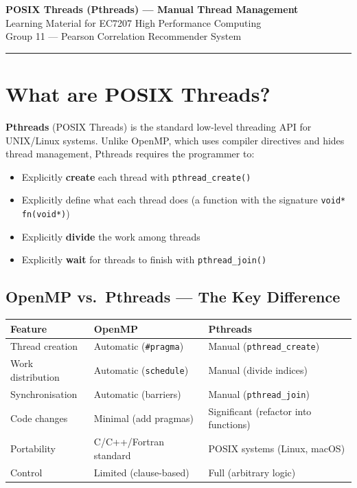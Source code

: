 \documentclass[12pt,a4paper]{article}
\begin{document}

\begin{center}
    {\LARGE\bfseries POSIX Threads (Pthreads) — Manual Thread Management}\\[0.5em]
    {\large Learning Material for EC7207 High Performance Computing}\\[0.3em]
    {\normalsize Group 11 — Pearson Correlation Recommender System}
\end{center}
\vspace{1em}\hrule\vspace{1.5em}

\section{What are POSIX Threads?}

\textbf{Pthreads} (POSIX Threads) is the standard low-level threading API
for UNIX/Linux systems.  Unlike OpenMP, which uses compiler directives and
hides thread management, Pthreads requires the programmer to:

\begin{itemize}
    \item Explicitly \textbf{create} each thread with \texttt{pthread\_create()}
    \item Explicitly define what each thread does (a function with the signature
          \texttt{void* fn(void*)})
    \item Explicitly \textbf{divide} the work among threads
    \item Explicitly \textbf{wait} for threads to finish with
          \texttt{pthread\_join()}
\end{itemize}

\subsection{OpenMP vs.\ Pthreads — The Key Difference}

\begin{center}
\begin{tabular}{lll}
\toprule
Feature & OpenMP & Pthreads \\
\midrule
Thread creation & Automatic (\texttt{\#pragma}) & Manual (\texttt{pthread\_create}) \\
Work distribution & Automatic (\texttt{schedule}) & Manual (divide indices) \\
Synchronisation & Automatic (barriers) & Manual (\texttt{pthread\_join}) \\
Code changes & Minimal (add pragmas) & Significant (refactor into functions) \\
Portability & C/C++/Fortran standard & POSIX systems (Linux, macOS) \\
Control & Limited (clause-based) & Full (arbitrary logic) \\
\bottomrule
\end{tabular}
\end{center}
\end{document}
